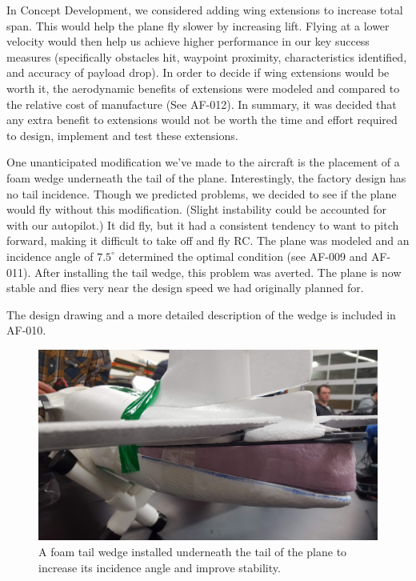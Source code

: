 \documentclass[]{auvsi_doc}
\begin{document}
In Concept Development, we considered adding wing extensions to increase total span. This would help the plane fly slower by increasing lift. Flying at a lower velocity would then help us achieve higher performance in our key success measures (specifically obstacles hit, waypoint proximity, characteristics identified, and accuracy of payload drop). In order to decide if wing extensions would be worth it, the aerodynamic benefits of extensions were modeled and compared to the relative cost of manufacture (See AF-012). In summary, it was decided that any extra benefit to extensions would not be worth the time and effort required to design, implement and test these extensions.

One unanticipated modification we've made to the aircraft is the placement of a foam wedge underneath the tail of the plane. Interestingly, the factory design has no tail incidence. Though we predicted problems, we decided to see if the plane would fly without this modification. (Slight instability could be accounted for with our autopilot.) It did fly, but it had a consistent tendency to want to pitch forward, making it difficult to take off and fly RC. The plane was modeled and an incidence angle of $7.5^\circ$ determined the optimal condition (see AF-009 and AF-011). After installing the tail wedge, this problem was averted. The plane is now stable and flies very near the design speed we had originally planned for.

The design drawing and a more detailed description of the wedge is included in AF-010.

\begin{figure}[h!]
	\centering
	\includegraphics[width=.75\columnwidth]{figs/tailwedge}
	\caption{A foam tail wedge installed underneath the tail of the plane to increase its incidence angle and improve stability.}
	\label{fig:wedge}
\end{figure}
\end{document}
